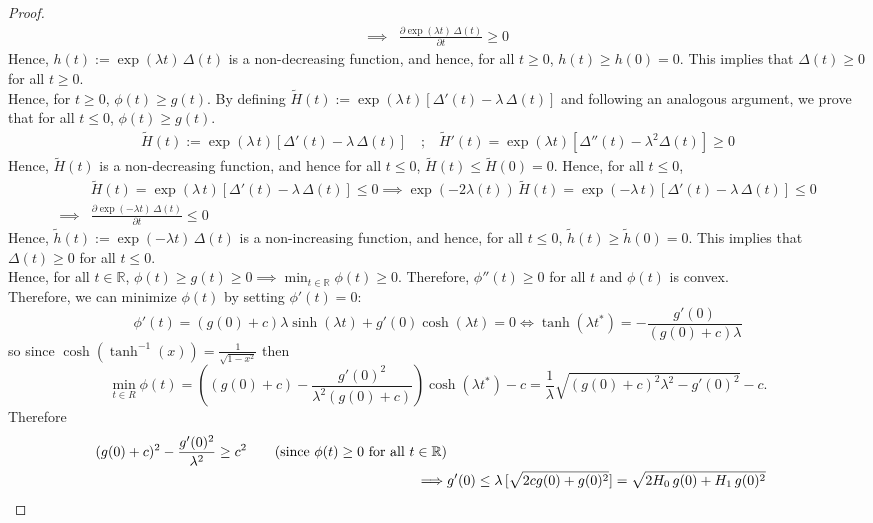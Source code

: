 \documentclass{article}
\newcommand{\R}{\mathbb{R}}
\begin{document}
\begin{proof}
\begin{align*}
\implies & \frac{\partial \exp(\lambda t) \, \Delta(t)}{\partial t} \geq 0
\end{align*}
Hence, $h(t) := \exp(\lambda t) \, \Delta(t)$ is a non-decreasing function, and hence, for all $t \geq 0$, $h(t) \geq h(0) = 0$. This implies that $\Delta(t) \geq 0$ for all $t \geq 0$. \\ 
Hence, for $t \geq 0$, $\phi(t) \geq g(t)$. By defining $\tilde{H}(t) := \exp(\lambda \, t) \left[ \Delta'(t) - \lambda \, \Delta(t) \right]$ and following an analogous argument, we prove that for all $t \leq 0$, $\phi(t) \geq g(t)$. 
\begin{align*}
\tilde{H}(t) := \exp(\lambda \, t) \left[ \Delta'(t) - \lambda \, \Delta(t) \right] \quad \text{;} \quad \tilde{H}'(t) = \exp(\lambda t) \left[ \Delta''(t) - \lambda^2 \Delta(t) \right] \geq 0  
\end{align*}
Hence, $\tilde{H}(t)$ is a non-decreasing function, and hence for all $t \leq 0$, $\tilde{H}(t) \leq \tilde{H}(0) = 0$. Hence, for all $t \leq 0$,
\begin{align*}
& \tilde{H}(t) = \exp(\lambda \, t) \left[ \Delta'(t) - \lambda \, \Delta(t) \right] \leq 0 \implies \exp(-2 \lambda(t) ) \, \tilde{H}(t) = \exp(-\lambda \, t) \left[ \Delta'(t) - \lambda \, \Delta(t) \right] \leq 0 \\
\implies & \frac{\partial \exp(-\lambda t) \, \Delta(t)}{\partial t} \leq 0    
\end{align*}
Hence, $\tilde{h}(t) := \exp(-\lambda t) \, \Delta(t)$ is a non-increasing function, and hence, for all $t \leq 0$, $\tilde{h}(t) \geq \tilde{h}(0) = 0$. This implies that $\Delta(t) \geq 0$ for all $t \leq 0$. \\ 
Hence, for all $t \in \R$, $\phi(t) \geq g(t) \geq 0 \implies \min_{t \in \R} \phi(t) \geq 0$. Therefore, $\phi''(t)\geq 0$ for all $t$ and $\phi(t)$ is convex. \\ 
Therefore, we can minimize $\phi(t)$ by setting $\phi'(t) = 0$:
\[
\phi'(t) = (g(0)+c)\lambda \sinh(\lambda t) + g'(0) \cosh(\lambda t) = 0 \iff \tanh(\lambda t^*) = -\frac{g'(0)}{(g(0)+c)\lambda }
\]
so since $\cosh(\tanh^{-1}(x))=\frac{1}{\sqrt{1-x^2}}$
then
\[
\min_{t\in R}\phi(t)
= \left((g(0)+c) - \frac{g'(0)^2}{\lambda^2(g(0)+c)}\right) \cosh(\lambda t^*) - c 
= \frac{1}{\lambda}\sqrt{(g(0)+c)^2\lambda^2 - g'(0)^2} - c.
\] 
Therefore
\begin{align*}
(g(0) + c)^2 - \frac{g'(0)^2}{\lambda^2} \geq c^2 \tag{since $\phi(t) \geq 0$ for all $t \in \R$} \\
\implies & g'(0) \leq \lambda \, [\sqrt{2 c g(0) + g(0)^2}] = \sqrt{2 H_0 \, g(0) + H_1 \, g(0)^2}
\end{align*}
\end{proof}
\end{document}

